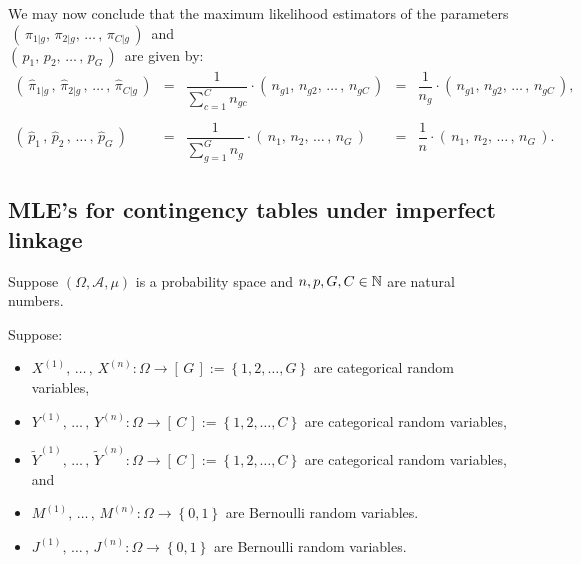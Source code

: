 We may now conclude that the maximum likelihood estimators of the parameters
\,$\left(\,\pi_{1\vert g},\,\pi_{2\vert g}, \,\ldots\,, \,\pi_{C\vert g}\,\right)$\,
and\\
$\left(\,p_{1},\,p_{2}, \,\ldots\,, \,p_{G}\,\right)$\,
are given by:
\begin{equation*}
	\begin{array}{ccccc}
	\left(\,\widehat{\pi}_{1\vert g}\,,\,\widehat{\pi}_{2\vert g}\,, \,\ldots\,, \,\widehat{\pi}_{C\vert g}\,\right)
	& = & \dfrac{1}{\sum^{C}_{c=1}n_{gc}} \cdot \left(\,n_{g1},\,n_{g2}, \,\ldots\,,\, n_{gC}\,\right)
	& = & \dfrac{1}{n_{g}} \cdot \left(\,n_{g1},\,n_{g2}, \,\ldots\,,\, n_{gC}\,\right),
	\\ \\
	\left(\,\widehat{p}_{1}\,,\,\widehat{p}_{2}\,, \,\ldots\,, \,\widehat{p}_{G}\,\right)
	& = & \dfrac{1}{\sum^{G}_{g=1}n_{g}} \cdot \left(\,n_{1},\,n_{2}, \,\ldots\,,\, n_{G}\,\right)
	& = & \dfrac{1}{n} \cdot \left(\,n_{1},\,n_{2}, \,\ldots\,,\, n_{G}\,\right).
	\end{array}
\end{equation*}


\subsection{MLE's for contingency tables under imperfect linkage}

Suppose
$\left(\Omega,\mathcal{A},\mu\right)$ is a probability space and
$n, p, G, C \in \mathbb{N}$ are natural numbers.

\vskip 0.3cm
\noindent
Suppose:
\begin{itemize}
\item
	$X^{(1)}, \,\ldots\,,\, X^{(n)} : \Omega \longrightarrow \left[\,G\,\right] := \left\{1,2,\ldots,G\right\}$
	are categorical random variables,
\item
	$Y^{(1)}, \,\ldots\,,\, Y^{(n)} : \Omega \longrightarrow \left[\,C\,\right] := \left\{1,2,\ldots,C\right\}$
	are categorical random variables,
\item
	$\widetilde{Y}^{(1)}, \,\ldots\,,\, \widetilde{Y}^{(n)} : \Omega \longrightarrow \left[\,C\,\right] := \left\{1,2,\ldots,C\right\}$
	are categorical random variables, and
\item
	$M^{(1)}, \,\ldots\,,\, M^{(n)} : \Omega \longrightarrow \left\{0,1\right\}$
	are Bernoulli random variables.
\item
	$J^{(1)}, \,\ldots\,,\, J^{(n)} : \Omega \longrightarrow \left\{0,1\right\}$
	are Bernoulli random variables.
\end{itemize}

